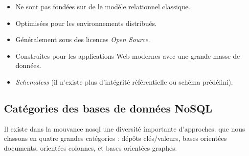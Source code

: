 \begin{itemize}
\item Ne sont pas fondées sur de le modèle relationnel classique.
\item Optimisées pour les environnements distribués.
\item Généralement sous des licences \emph{Open Source}.
\item Construites pour les applications Web modernes avec une grande
  masse de données.
\item \emph{Schemaless} (il n'existe plus d'intégrité référentielle ou
  schéma prédéfini).
\end{itemize}

  \subsection{Catégories des bases de données NoSQL}
  \label{sec:cat-nosql}
  Il existe dans la mouvance \acrshort{nosql} une diversité importante
  d'approches. que nous classons en quatre grandes catégories : dépôts
  clés/valeurs, bases orientées documents, orientées colonnes, et
  bases orientées graphes.

